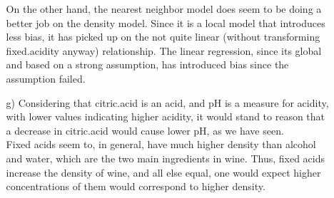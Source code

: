 \documentclass[11pt]{article}
\theoremstyle{definition}
\begin{document}
\begin{enumerate}
\begin{enumerate}
                On the other hand, the nearest neighbor model does seem to be doing a better job on the density model. Since it is a local model that introduces less bias, it has picked up on the not quite linear (without transforming fixed.acidity anyway) relationship. The linear regression, since its global and based on a strong assumption, has introduced bias since the assumption failed.
            \item[g)]
                Considering that citric.acid is an acid, and pH is a measure for acidity, with lower values indicating higher acidity, it would stand to reason that a decrease in citric.acid would cause lower pH, as we have seen. \\
                Fixed acids seem to, in general, have much higher density than alcohol and water, which are the two main ingredients in wine. Thus, fixed acids increase the density of wine, and all else equal, one would expect higher concentrations of them would correspond to higher density.
        \end{enumerate}

\end{enumerate}
\end{document}
